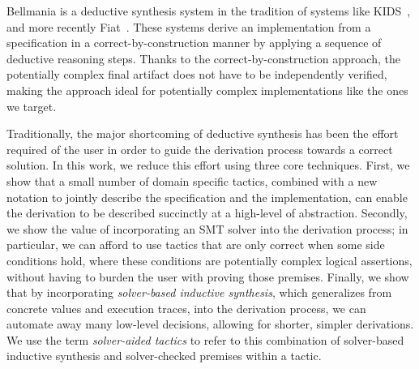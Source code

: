 Bellmania is a deductive synthesis system in the tradition of systems like KIDS~\cite{TSE90/Smith}, and more recently Fiat~\cite{POPL15/Delaware}. 
These systems derive an implementation from a specification in a correct-by-construction manner by applying a sequence of deductive reasoning steps. Thanks to the correct-by-construction approach, the potentially complex final artifact does not have to be independently verified, making the approach ideal for potentially complex implementations like the ones we target. 

Traditionally, the major shortcoming of deductive synthesis has been the effort required of the user in order to guide the derivation process towards a correct solution. In this work, we reduce this effort using three core techniques. 
First, we show that a small number of domain specific tactics, combined with a new notation to jointly describe the specification and the implementation, can enable the derivation to be described succinctly at a high-level of abstraction. Secondly, we show the value of incorporating an SMT solver into the derivation process; in particular, we can afford to use tactics that are only correct when some side conditions hold, where these conditions are potentially complex logical assertions, without having to burden the user with proving those premises. Finally, we show that by incorporating \emph{solver-based inductive synthesis},
which generalizes from concrete values and execution traces, into the derivation process, we can automate away many low-level decisions, allowing for shorter, simpler derivations. We use the term \emph{solver-aided tactics} to refer to this combination of solver-based inductive synthesis and solver-checked premises within a tactic.

